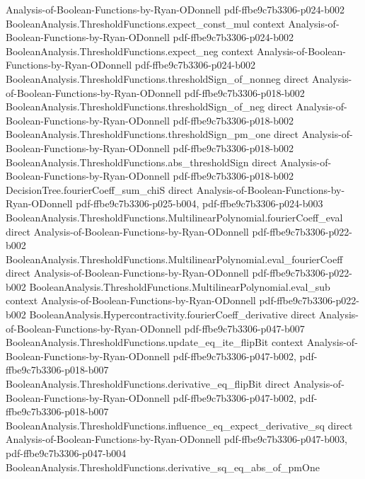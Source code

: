 \begin{theorem}
  {Analysis-of-Boolean-Functions-by-Ryan-ODonnell}
  {pdf-ffbe9c7b3306-p024-b002}
\proofstep
  {BooleanAnalysis.ThresholdFunctions.expect_const_mul}
  {context}
  {Analysis-of-Boolean-Functions-by-Ryan-ODonnell}
  {pdf-ffbe9c7b3306-p024-b002}
\proofstep
  {BooleanAnalysis.ThresholdFunctions.expect_neg}
  {context}
  {Analysis-of-Boolean-Functions-by-Ryan-ODonnell}
  {pdf-ffbe9c7b3306-p024-b002}
\proofstep
  {BooleanAnalysis.ThresholdFunctions.thresholdSign_of_nonneg}
  {direct}
  {Analysis-of-Boolean-Functions-by-Ryan-ODonnell}
  {pdf-ffbe9c7b3306-p018-b002}
\proofstep
  {BooleanAnalysis.ThresholdFunctions.thresholdSign_of_neg}
  {direct}
  {Analysis-of-Boolean-Functions-by-Ryan-ODonnell}
  {pdf-ffbe9c7b3306-p018-b002}
\proofstep
  {BooleanAnalysis.ThresholdFunctions.thresholdSign_pm_one}
  {direct}
  {Analysis-of-Boolean-Functions-by-Ryan-ODonnell}
  {pdf-ffbe9c7b3306-p018-b002}
\proofstep
  {BooleanAnalysis.ThresholdFunctions.abs_thresholdSign}
  {direct}
  {Analysis-of-Boolean-Functions-by-Ryan-ODonnell}
  {pdf-ffbe9c7b3306-p018-b002}
\proofstep
  {DecisionTree.fourierCoeff_sum_chiS}
  {direct}
  {Analysis-of-Boolean-Functions-by-Ryan-ODonnell}
  {pdf-ffbe9c7b3306-p025-b004,
    pdf-ffbe9c7b3306-p024-b003}
\proofstep
  {BooleanAnalysis.ThresholdFunctions.MultilinearPolynomial.fourierCoeff_eval}
  {direct}
  {Analysis-of-Boolean-Functions-by-Ryan-ODonnell}
  {pdf-ffbe9c7b3306-p022-b002}
\proofstep
  {BooleanAnalysis.ThresholdFunctions.MultilinearPolynomial.eval_fourierCoeff}
  {direct}
  {Analysis-of-Boolean-Functions-by-Ryan-ODonnell}
  {pdf-ffbe9c7b3306-p022-b002}
\proofstep
  {BooleanAnalysis.ThresholdFunctions.MultilinearPolynomial.eval_sub}
  {context}
  {Analysis-of-Boolean-Functions-by-Ryan-ODonnell}
  {pdf-ffbe9c7b3306-p022-b002}
\proofstep
  {BooleanAnalysis.Hypercontractivity.fourierCoeff_derivative}
  {direct}
  {Analysis-of-Boolean-Functions-by-Ryan-ODonnell}
  {pdf-ffbe9c7b3306-p047-b007}
\proofstep
  {BooleanAnalysis.ThresholdFunctions.update_eq_ite_flipBit}
  {context}
  {Analysis-of-Boolean-Functions-by-Ryan-ODonnell}
  {pdf-ffbe9c7b3306-p047-b002,
    pdf-ffbe9c7b3306-p018-b007}
\proofstep
  {BooleanAnalysis.ThresholdFunctions.derivative_eq_flipBit}
  {direct}
  {Analysis-of-Boolean-Functions-by-Ryan-ODonnell}
  {pdf-ffbe9c7b3306-p047-b002,
    pdf-ffbe9c7b3306-p018-b007}
\proofstep
  {BooleanAnalysis.ThresholdFunctions.influence_eq_expect_derivative_sq}
  {direct}
  {Analysis-of-Boolean-Functions-by-Ryan-ODonnell}
  {pdf-ffbe9c7b3306-p047-b003,
    pdf-ffbe9c7b3306-p047-b004}
\proofstep
  {BooleanAnalysis.ThresholdFunctions.derivative_sq_eq_abs_of_pmOne}

\end{theorem}
